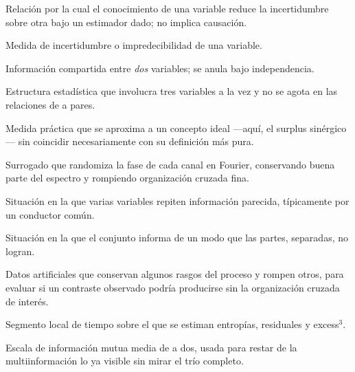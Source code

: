 \documentclass[11pt,a4paper]{article}
\begin{document}
\begin{description}[style=nextline,leftmargin=1em,itemsep=5pt]
  \item[Dependencia estad\'istica]
    Relaci\'on por la cual el conocimiento de una variable reduce la
    incertidumbre sobre otra bajo un estimador dado; no implica causaci\'on.

  \item[Entrop\'ia]
    Medida de incertidumbre o impredecibilidad de una variable.

  \item[Informaci\'on mutua]
    Informaci\'on compartida entre \emph{dos} variables; se anula bajo
    independencia.

  \item[Orden 3]
    Estructura estad\'istica que involucra tres variables a la vez y no se
    agota en las relaciones de a pares.

  \item[Proxy]
    Medida pr\'actica que se aproxima a un concepto ideal ---aqu\'i, el
    surplus sin\'ergico--- sin coincidir necesariamente con su definici\'on
    m\'as pura.

  \item[Phase-shuffle]
    Surrogado que randomiza la fase de cada canal en Fourier, conservando
    buena parte del espectro y rompiendo organizaci\'on cruzada fina.

  \item[Redundancia (informal)]
    Situaci\'on en la que varias variables repiten informaci\'on parecida,
    t\'ipicamente por un conductor com\'un.

  \item[Sinergia (informal)]
    Situaci\'on en la que el conjunto informa de un modo que las partes,
    separadas, no logran.

  \item[Surrogado / nulo]
    Datos artificiales que conservan algunos rasgos del proceso y rompen
    otros, para evaluar si un contraste observado podr\'ia producirse sin la
    organizaci\'on cruzada de inter\'es.

  \item[Ventana]
    Segmento local de tiempo sobre el que se estiman entrop\'ias, residuales
    y excess$^3$.

  \item[Baseline de parejas ($I_{\mathrm{pair}}$)]
    Escala de informaci\'on mutua media de a dos, usada para restar de la
    multiinformaci\'on lo ya visible sin mirar el tr\'io completo.


\end{description}
\end{document}
